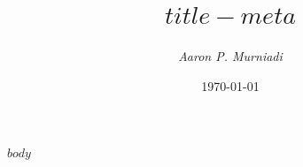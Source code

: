 \documentclass{scrarticle}
\date{\small{\today}}
\author{\textit{Aaron P. Murniadi}}
\title{$title-meta$}
\begin{document}
\maketitle
\tableofcontents
$body$
\end{document}
